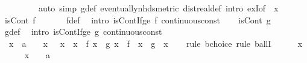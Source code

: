 \begin{isabellebody}
\ \ \ \ \ \ \ \ \ {\isacharparenleft}{\kern0pt}auto\ simp{\isacharcolon}{\kern0pt}\ g{\isacharunderscore}{\kern0pt}def\ eventually{\isacharunderscore}{\kern0pt}nhds{\isacharunderscore}{\kern0pt}metric\ dist{\isacharunderscore}{\kern0pt}real{\isacharunderscore}{\kern0pt}def\ intro{\isacharbang}{\kern0pt}{\isacharcolon}{\kern0pt}\ exI{\isacharbrackleft}{\kern0pt}of\ {\isacharunderscore}{\kern0pt}\ x{\isacharbrackright}{\kern0pt}{\isacharparenright}{\kern0pt}\isanewline
\isanewline
\ \ \isamarkupfalse%
\ {\isachardoublequoteopen}isCont\ f\ {}{\isachardoublequoteclose}\isanewline
\ \ \ \ \isamarkupfalse%
\ f{\isacharunderscore}{\kern0pt}def\ \isamarkupfalse%
\ {\isacharparenleft}{\kern0pt}intro\ isCont{\isacharunderscore}{\kern0pt}If{\isacharunderscore}{\kern0pt}ge\ f{\isacharunderscore}{\kern0pt}{}\ continuous{\isacharunderscore}{\kern0pt}const{\isacharparenright}{\kern0pt}\isanewline
\isanewline
\ \ \isamarkupfalse%
\ {\isachardoublequoteopen}isCont\ g\ {}{\isachardoublequoteclose}\isanewline
\ \ \ \ \isamarkupfalse%
\ g{\isacharunderscore}{\kern0pt}def\ \isamarkupfalse%
\ {\isacharparenleft}{\kern0pt}intro\ isCont{\isacharunderscore}{\kern0pt}If{\isacharunderscore}{\kern0pt}ge\ g{\isacharunderscore}{\kern0pt}{}\ continuous{\isacharunderscore}{\kern0pt}const{\isacharparenright}{\kern0pt}\isanewline
\isanewline
\ \ \isamarkupfalse%
\ {\isachardoublequoteopen}{\isasymexists}{\isasymzeta}{\isachardot}{\kern0pt}\ {\isasymforall}x{\isasymin}{\isacharbraceleft}{\kern0pt}{}\ {\isacharless}{\kern0pt}{\isachardot}{\kern0pt}{\isachardot}{\kern0pt}{\isacharless}{\kern0pt}\ a{\isacharbraceright}{\kern0pt}{\isachardot}{\kern0pt}\ {}\ {\isacharless}{\kern0pt}\ {\isasymzeta}\ x\ {\isasymand}\ {\isasymzeta}\ x\ {\isacharless}{\kern0pt}\ x\ {\isasymand}\ f\ x\ {\isacharslash}{\kern0pt}\ g\ x\ {\isacharequal}{\kern0pt}\ f{\isacharprime}{\kern0pt}\ {\isacharparenleft}{\kern0pt}{\isasymzeta}\ x{\isacharparenright}{\kern0pt}\ {\isacharslash}{\kern0pt}\ g{\isacharprime}{\kern0pt}\ {\isacharparenleft}{\kern0pt}{\isasymzeta}\ x{\isacharparenright}{\kern0pt}{\isachardoublequoteclose}\isanewline
\ \ \isamarkupfalse%
\ {\isacharparenleft}{\kern0pt}rule\ bchoice{\isacharcomma}{\kern0pt}\ rule\ ballI{\isacharparenright}{\kern0pt}\isanewline
\ \ \ \ \isamarkupfalse%
\ x\isanewline
\ \ \ \ \isamarkupfalse%
\ {\isachardoublequoteopen}x\ {\isasymin}\ {\isacharbraceleft}{\kern0pt}{}\ {\isacharless}{\kern0pt}{\isachardot}{\kern0pt}{\isachardot}{\kern0pt}{\isacharless}{\kern0pt}\ a{\isacharbraceright}{\kern0pt}{\isachardoublequoteclose}\isanewline

\end{isabellebody}
